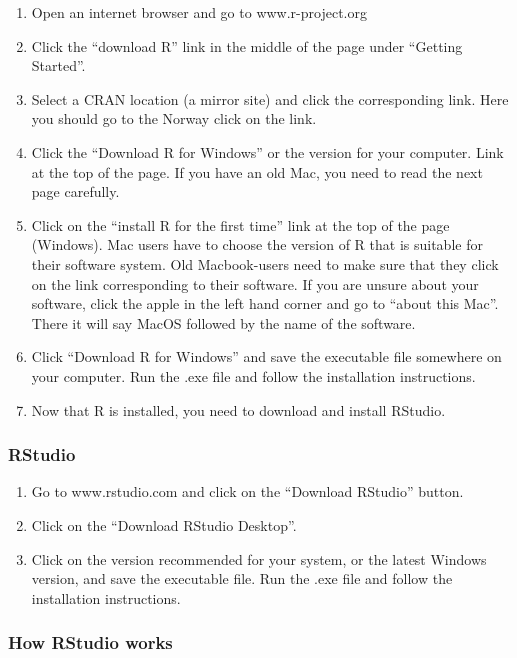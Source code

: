 \documentclass[
]{article}
\providecommand{\tightlist}{%
  \setlength{\itemsep}{0pt}\setlength{\parskip}{0pt}}
\begin{document}
\begin{enumerate}
\def\labelenumi{\arabic{enumi}.}
\tightlist
\item
  Open an internet browser and go to www.r-project.org
\item
  Click the ``download R'' link in the middle of the page under
  ``Getting Started''.
\item
  Select a CRAN location (a mirror site) and click the corresponding
  link. Here you should go to the Norway click on the link.
\item
  Click the ``Download R for Windows'' or the version for your computer.
  Link at the top of the page. If you have an old Mac, you need to read
  the next page carefully.
\item
  Click on the ``install R for the first time'' link at the top of the
  page (Windows). Mac users have to choose the version of R that is
  suitable for their software system. Old Macbook-users need to make
  sure that they click on the link corresponding to their software. If
  you are unsure about your software, click the apple in the left hand
  corner and go to ``about this Mac''. There it will say MacOS followed
  by the name of the software.
\item
  Click ``Download R for Windows'' and save the executable file
  somewhere on your computer. Run the .exe file and follow the
  installation instructions.
\item
  Now that R is installed, you need to download and install RStudio.
\end{enumerate}

\hypertarget{rstudio}{%
\subsubsection{RStudio}\label{rstudio}}

\begin{enumerate}
\def\labelenumi{\arabic{enumi}.}
\tightlist
\item
  Go to www.rstudio.com and click on the ``Download RStudio'' button.
\item
  Click on the ``Download RStudio Desktop''.
\item
  Click on the version recommended for your system, or the latest
  Windows version, and save the executable file. Run the .exe file and
  follow the installation instructions.
\end{enumerate}

\hypertarget{how-rstudio-works}{%
\subsubsection{How RStudio works}\label{how-rstudio-works}}
\end{document}
